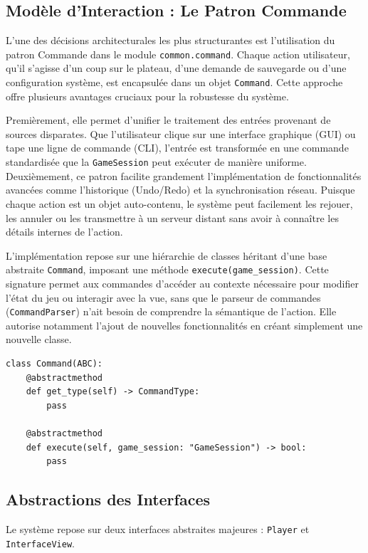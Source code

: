 \documentclass[a4paper]{article}
\begin{document}
\subsection{Modèle d'Interaction : Le Patron Commande}

L'une des décisions architecturales les plus structurantes est l'utilisation du patron Commande dans le module \texttt{common.command}. Chaque action utilisateur, qu'il s'agisse d'un coup sur le plateau, d'une demande de sauvegarde ou d'une configuration système, est encapsulée dans un objet \texttt{Command}. Cette approche offre plusieurs avantages cruciaux pour la robustesse du système.

Premièrement, elle permet d'unifier le traitement des entrées provenant de sources disparates. Que l'utilisateur clique sur une interface graphique (GUI) ou tape une ligne de commande (CLI), l'entrée est transformée en une commande standardisée que la \texttt{GameSession} peut exécuter de manière uniforme. Deuxièmement, ce patron facilite grandement l'implémentation de fonctionnalités avancées comme l'historique (Undo/Redo) et la synchronisation réseau. Puisque chaque action est un objet auto-contenu, le système peut facilement les rejouer, les annuler ou les transmettre à un serveur distant sans avoir à connaître les détails internes de l'action.

L'implémentation repose sur une hiérarchie de classes héritant d'une base abstraite \texttt{Command}, imposant une méthode \texttt{execute(game\_session)}. Cette signature permet aux commandes d'accéder au contexte nécessaire pour modifier l'état du jeu ou interagir avec la vue, sans que le parseur de commandes (\texttt{CommandParser}) n'ait besoin de comprendre la sémantique de l'action. Elle autorise notamment l'ajout de nouvelles fonctionnalités en créant simplement une nouvelle classe.

\begin{verbatim}
class Command(ABC):
    @abstractmethod
    def get_type(self) -> CommandType:
        pass

    @abstractmethod
    def execute(self, game_session: "GameSession") -> bool:
        pass
\end{verbatim}

\subsection{Abstractions des Interfaces}

Le système repose sur deux interfaces abstraites majeures : \texttt{Player} et \texttt{InterfaceView}.
\end{document}
